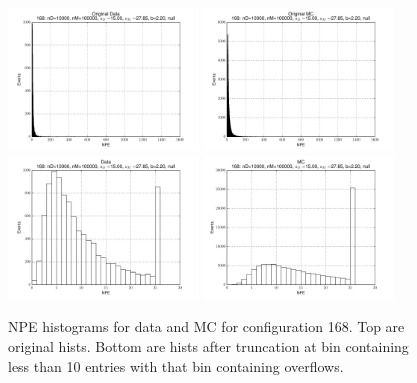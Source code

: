  \begin{figure}[htbp] \begin{center} 
\includegraphics[width=0.45\textwidth]{../FIGURES/168/FIG_Original_Data.pdf} 
\includegraphics[width=0.45\textwidth]{../FIGURES/168/FIG_Original_MC.pdf} 
\includegraphics[width=0.45\textwidth]{../FIGURES/168/FIG_Data.pdf} 
\includegraphics[width=0.45\textwidth]{../FIGURES/168/FIG_MC.pdf} 
\caption{NPE histograms for data and MC for configuration 168. Top are original hists. Bottom are hists after truncation at bin containing less than 10 entries with that bin containing overflows.} 
\label{tab:npe_168} 
\end{center} \end{figure} 
\clearpage
 